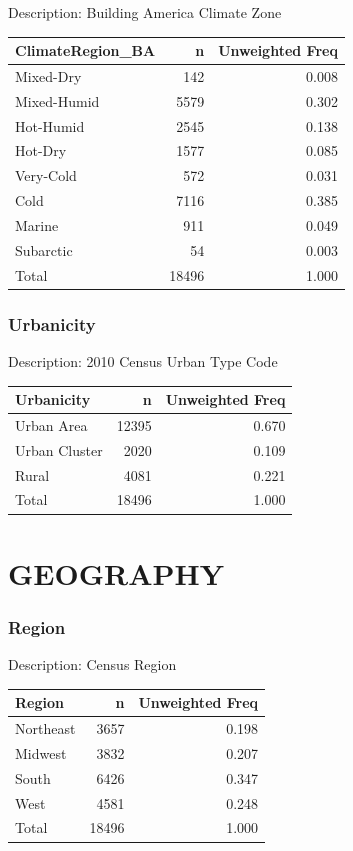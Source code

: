 \documentclass[
]{krantz}
\begin{document}
Description: Building America Climate Zone

\begin{tabular}[t]{l|r|r}
\hline
ClimateRegion\_BA & n & Unweighted Freq\\
\hline
Mixed-Dry & 142 & 0.008\\
\hline
Mixed-Humid & 5579 & 0.302\\
\hline
Hot-Humid & 2545 & 0.138\\
\hline
Hot-Dry & 1577 & 0.085\\
\hline
Very-Cold & 572 & 0.031\\
\hline
Cold & 7116 & 0.385\\
\hline
Marine & 911 & 0.049\\
\hline
Subarctic & 54 & 0.003\\
\hline
Total & 18496 & 1.000\\
\hline
\end{tabular}

\hypertarget{urbanicity}{%
\subsubsection*{Urbanicity}\label{urbanicity}}


Description: 2010 Census Urban Type Code

\begin{tabular}[t]{l|r|r}
\hline
Urbanicity & n & Unweighted Freq\\
\hline
Urban Area & 12395 & 0.670\\
\hline
Urban Cluster & 2020 & 0.109\\
\hline
Rural & 4081 & 0.221\\
\hline
Total & 18496 & 1.000\\
\hline
\end{tabular}

\hypertarget{geography}{%
\section{GEOGRAPHY}\label{geography}}

\hypertarget{region}{%
\subsubsection*{Region}\label{region}}


Description: Census Region

\begin{tabular}[t]{l|r|r}
\hline
Region & n & Unweighted Freq\\
\hline
Northeast & 3657 & 0.198\\
\hline
Midwest & 3832 & 0.207\\
\hline
South & 6426 & 0.347\\
\hline
West & 4581 & 0.248\\
\hline
Total & 18496 & 1.000\\
\hline
\end{tabular}
\end{document}
